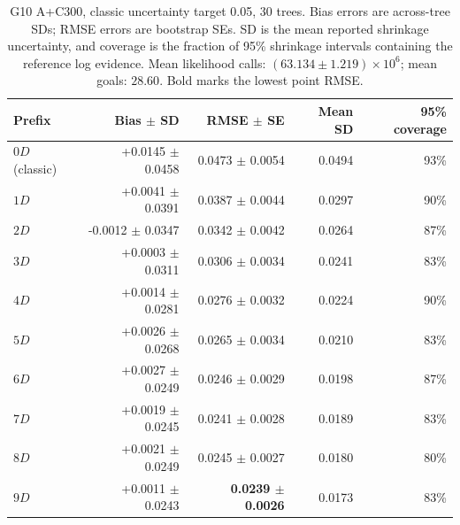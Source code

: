 \begin{table}[t]
\centering
\scriptsize
\caption{G10 A+C300, classic uncertainty target 0.05, 30 trees. Bias errors are across-tree SDs; RMSE errors are bootstrap SEs. SD is the mean reported shrinkage uncertainty, and coverage is the fraction of 95\% shrinkage intervals containing the reference log evidence. Mean likelihood calls: $(63.134\pm1.219)\times10^6$; mean goals: $28.60$. Bold marks the lowest point RMSE.}
\label{tab:phantom_evidence_g10_0p05}
\begin{tabular}{lrrrr}
\toprule
Prefix & Bias $\pm$ SD & RMSE $\pm$ SE & Mean SD & 95\% coverage \\
\midrule
$0D$ (classic) & +0.0145 $\pm$ 0.0458 & 0.0473 $\pm$ 0.0054 & 0.0494 & 93\% \\
$1D$ & +0.0041 $\pm$ 0.0391 & 0.0387 $\pm$ 0.0044 & 0.0297 & 90\% \\
$2D$ & -0.0012 $\pm$ 0.0347 & 0.0342 $\pm$ 0.0042 & 0.0264 & 87\% \\
$3D$ & +0.0003 $\pm$ 0.0311 & 0.0306 $\pm$ 0.0034 & 0.0241 & 83\% \\
$4D$ & +0.0014 $\pm$ 0.0281 & 0.0276 $\pm$ 0.0032 & 0.0224 & 90\% \\
$5D$ & +0.0026 $\pm$ 0.0268 & 0.0265 $\pm$ 0.0034 & 0.0210 & 83\% \\
$6D$ & +0.0027 $\pm$ 0.0249 & 0.0246 $\pm$ 0.0029 & 0.0198 & 87\% \\
$7D$ & +0.0019 $\pm$ 0.0245 & 0.0241 $\pm$ 0.0028 & 0.0189 & 83\% \\
$8D$ & +0.0021 $\pm$ 0.0249 & 0.0245 $\pm$ 0.0027 & 0.0180 & 80\% \\
$9D$ & +0.0011 $\pm$ 0.0243 & \textbf{0.0239 $\pm$ 0.0026} & 0.0173 & 83\% \\
\bottomrule
\end{tabular}
\end{table}


